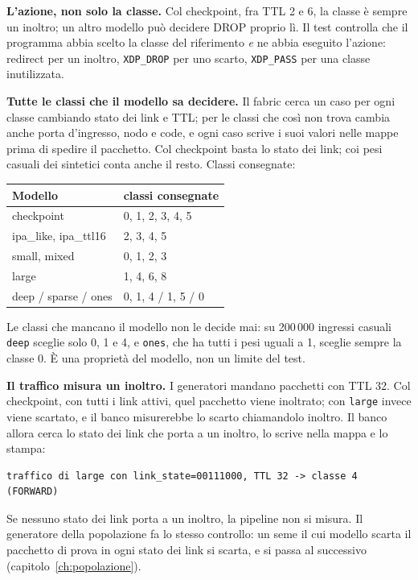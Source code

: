 \documentclass[11pt,a4paper,oneside]{report}
\begin{document}
\textbf{L'azione, non solo la classe.} Col checkpoint, fra TTL 2 e 6, la classe
è sempre un inoltro; un altro modello può decidere DROP proprio lì. Il test
controlla che il programma abbia scelto la classe del riferimento \emph{e} ne
abbia eseguito l'azione: redirect per un inoltro, \texttt{XDP\_DROP} per uno
scarto, \texttt{XDP\_PASS} per una classe inutilizzata.

\textbf{Tutte le classi che il modello sa decidere.} Il fabric cerca un caso per
ogni classe cambiando stato dei link e TTL; per le classi che così non trova
cambia anche porta d'ingresso, nodo e code, e ogni caso scrive i suoi valori
nelle mappe prima di spedire il pacchetto. Col checkpoint basta lo stato dei
link; coi pesi casuali dei sintetici conta anche il resto. Classi consegnate:

\begin{center}
\small
\begin{tabular}{@{}ll@{}}
\toprule
\textbf{Modello} & \textbf{classi consegnate} \\
\midrule
checkpoint & 0, 1, 2, 3, 4, 5 \\
ipa\_like, ipa\_ttl16 & 2, 3, 4, 5 \\
small, mixed & 0, 1, 2, 3 \\
large & 1, 4, 6, 8 \\
deep / sparse / ones & 0, 1, 4 / 1, 5 / 0 \\
\bottomrule
\end{tabular}
\end{center}
Le classi che mancano il modello non le decide mai: su 200\,000 ingressi casuali
\texttt{deep} sceglie solo 0, 1 e 4, e \texttt{ones}, che ha tutti i pesi uguali
a 1, sceglie sempre la classe 0. È una proprietà del modello, non un limite del
test.

\textbf{Il traffico misura un inoltro.} I generatori mandano pacchetti con TTL
32. Col checkpoint, con tutti i link attivi, quel pacchetto viene inoltrato; con
\texttt{large} invece viene scartato, e il banco misurerebbe lo scarto
chiamandolo inoltro. Il banco allora cerca lo stato dei link che porta a un
inoltro, lo scrive nella mappa e lo stampa:
\begin{lstlisting}
traffico di large con link_state=00111000, TTL 32 -> classe 4 (FORWARD)
\end{lstlisting}
Se nessuno stato dei link porta a un inoltro, la pipeline non si misura. Il
generatore della popolazione fa lo stesso controllo: un seme il cui modello
scarta il pacchetto di prova in ogni stato dei link si scarta, e si passa al
successivo (capitolo~\ref{ch:popolazione}).
\end{document}
